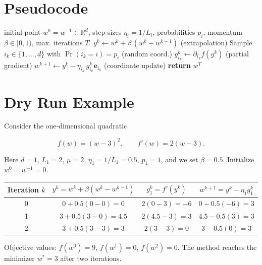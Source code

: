 \documentclass{article}
\newcommand{\R}{\mathbb{R}}
\newcommand{\be}{\mathbf{e}}
\begin{document}
\section*{Pseudocode}
\begin{algorithm}[H]
\caption{ARCD‑M}
\begin{algorithmic}[1]
\Require initial point $w^{0}=w^{-1}\in\R^{d}$, step sizes $\eta_{i}=1/L_{i}$,
probabilities $p_{i}$, momentum $\beta\in[0,1)$, max. iterations $T$.
    \State $y^{k}\gets w^{k}+ \beta\,(w^{k}-w^{k-1})$ \hfill (extrapolation) \label{line:extrap}
    \State Sample $i_{k}\in\{1,\dots ,d\}$ with $\Pr(i_{k}=i)=p_{i}$ \hfill (random coord.) \label{line:sample}
    \State $g^{k}_{i_{k}}\gets \partial_{i_{k}}f(y^{k})$ \hfill (partial gradient) \label{line:grad}
    \State $w^{k+1}\gets y^{k}-\eta_{i_{k}}\,g^{k}_{i_{k}}\be_{i_{k}}$ \hfill (coordinate update) \label{line:update}
\EndFor
\State \textbf{return} $w^{T}$
\end{algorithmic}
\end{algorithm}

\section*{Dry Run Example}
Consider the one‑dimensional quadratic  

\[
f(w)=(w-3)^{2},\qquad f'(w)=2(w-3).
\]

Here $d=1$, $L_{1}=2$, $\mu=2$, $\eta_{1}=1/L_{1}=0.5$, $p_{1}=1$, and we set
$\beta=0.5$.  
Initialize $w^{0}=w^{-1}=0$.

\medskip
\begin{tabular}{c|c|c|c}
Iteration $k$ & $y^{k}=w^{k}+ \beta(w^{k}-w^{k-1})$ & $g^{k}_{1}=f'(y^{k})$ &
$w^{k+1}=y^{k}-\eta_{1}g^{k}_{1}$ \\ \hline
0 & $0+0.5(0-0)=0$ & $2(0-3)=-6$ & $0-0.5(-6)=3$ \\[4pt]
1 & $3+0.5(3-0)=4.5$ & $2(4.5-3)=3$ & $4.5-0.5(3)=3$ \\[4pt]
2 & $3+0.5(3-3)=3$ & $2(3-3)=0$ & $3-0.5(0)=3$ 
\end{tabular}

Objective values: $f(w^{0})=9$, $f(w^{1})=0$, $f(w^{2})=0$.  
The method reaches the minimizer $w^{*}=3$ after two iterations.

\end{document}
